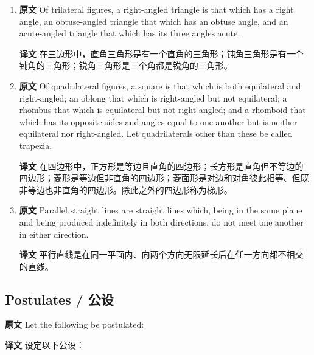 \documentclass[UTF8,zihao=-4]{ctexart}
\begin{document}
\begin{enumerate}
\item \textbf{原文} Of trilateral figures, a right-angled triangle is that which has a right angle, an obtuse-angled triangle that which has an obtuse angle, and an acute-angled triangle that which has its three angles acute. \par\textbf{译文} 在三边形中，直角三角形是有一个直角的三角形；钝角三角形是有一个钝角的三角形；锐角三角形是三个角都是锐角的三角形。
\item \textbf{原文} Of quadrilateral figures, a square is that which is both equilateral and right-angled; an oblong that which is right-angled but not equilateral; a rhombus that which is equilateral but not right-angled; and a rhomboid that which has its opposite sides and angles equal to one another but is neither equilateral nor right-angled. Let quadrilaterals other than these be called trapezia. \par\textbf{译文} 在四边形中，正方形是等边且直角的四边形；长方形是直角但不等边的四边形；菱形是等边但非直角的四边形；菱面形是对边和对角彼此相等、但既非等边也非直角的四边形。除此之外的四边形称为梯形。
\item \textbf{原文} Parallel straight lines are straight lines which, being in the same plane and being produced indefinitely in both directions, do not meet one another in either direction. \par\textbf{译文} 平行直线是在同一平面内、向两个方向无限延长后在任一方向都不相交的直线。
\end{enumerate}

\subsection*{Postulates / 公设}

\noindent\textbf{原文} Let the following be postulated:

\noindent\textbf{译文} 设定以下公设：
\end{document}
